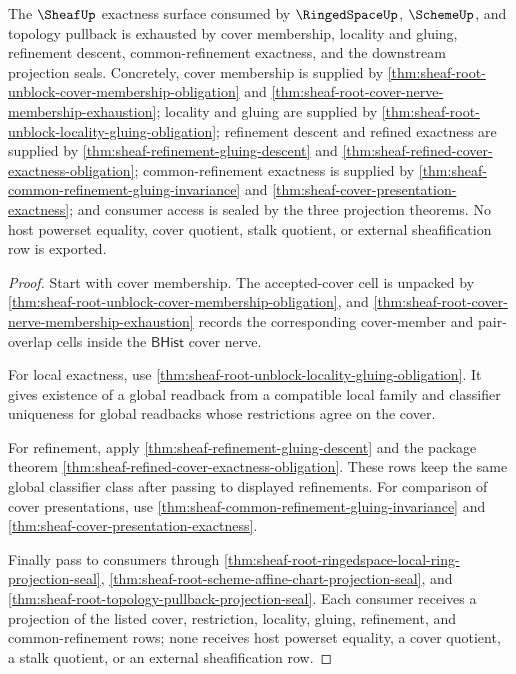 \begin{theorem}
\label{thm:sheaf-root-downstream-consumer-exactness-coverage}
The $\SheafUp$ exactness surface consumed by $\RingedSpaceUp$, $\SchemeUp$, and topology pullback is exhausted by cover membership, locality and gluing, refinement descent, common-refinement exactness, and the downstream projection seals. Concretely, cover membership is supplied by \autoref{thm:sheaf-root-unblock-cover-membership-obligation} and \autoref{thm:sheaf-root-cover-nerve-membership-exhaustion}; locality and gluing are supplied by \autoref{thm:sheaf-root-unblock-locality-gluing-obligation}; refinement descent and refined exactness are supplied by \autoref{thm:sheaf-refinement-gluing-descent} and \autoref{thm:sheaf-refined-cover-exactness-obligation}; common-refinement exactness is supplied by \autoref{thm:sheaf-common-refinement-gluing-invariance} and \autoref{thm:sheaf-cover-presentation-exactness}; and consumer access is sealed by the three projection theorems. No host powerset equality, cover quotient, stalk quotient, or external sheafification row is exported.
\end{theorem}
\begin{proof}
Start with cover membership. The accepted-cover cell is unpacked by \autoref{thm:sheaf-root-unblock-cover-membership-obligation}, and \autoref{thm:sheaf-root-cover-nerve-membership-exhaustion} records the corresponding cover-member and pair-overlap cells inside the $\mathsf{BHist}$ cover nerve.

For local exactness, use \autoref{thm:sheaf-root-unblock-locality-gluing-obligation}. It gives existence of a global readback from a compatible local family and classifier uniqueness for global readbacks whose restrictions agree on the cover.

For refinement, apply \autoref{thm:sheaf-refinement-gluing-descent} and the package theorem \autoref{thm:sheaf-refined-cover-exactness-obligation}. These rows keep the same global classifier class after passing to displayed refinements. For comparison of cover presentations, use \autoref{thm:sheaf-common-refinement-gluing-invariance} and \autoref{thm:sheaf-cover-presentation-exactness}.

Finally pass to consumers through \autoref{thm:sheaf-root-ringedspace-local-ring-projection-seal}, \autoref{thm:sheaf-root-scheme-affine-chart-projection-seal}, and \autoref{thm:sheaf-root-topology-pullback-projection-seal}. Each consumer receives a projection of the listed cover, restriction, locality, gluing, refinement, and common-refinement rows; none receives host powerset equality, a cover quotient, a stalk quotient, or an external sheafification row.
\end{proof}
